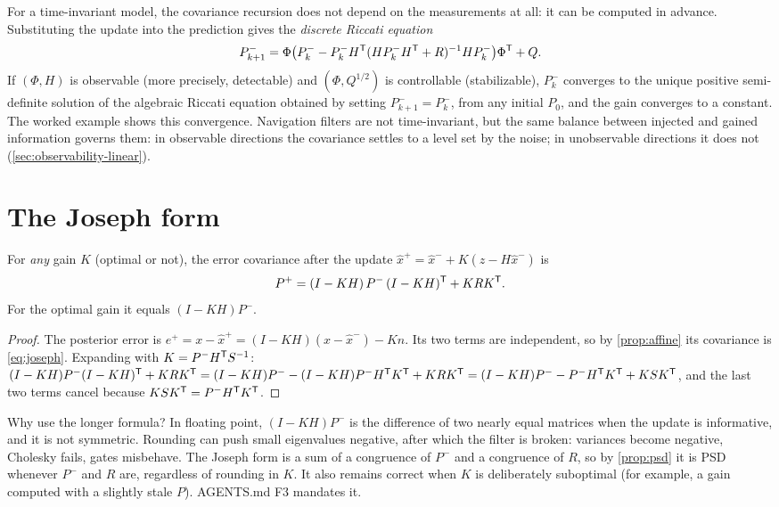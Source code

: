 For a time-invariant model, the covariance recursion does not depend on the measurements at all: it can be computed in advance. Substituting the
update into the prediction gives the \emph{discrete Riccati equation}
\begin{equation}
  P_{k+1}^- = \Phi\big(P_k^- - P_k^-H^{\mathsf{T}}(HP_k^-H^{\mathsf{T}} + R)^{-1} HP_k^-\big)\Phi^{\mathsf{T}} + Q .
\end{equation}
If $(\Phi, H)$ is observable (more precisely, detectable) and $(\Phi, Q^{1/2})$ is controllable (stabilizable), $P_k^-$ converges to the unique positive
semi-definite solution of the algebraic Riccati equation obtained by setting $P_{k+1}^- = P_k^-$, from any initial $P_0$, and the gain converges to a constant.
The worked example shows this convergence. Navigation filters are not time-invariant, but the same balance between injected and gained
information governs them: in observable directions the covariance settles to a level set by the noise; in unobservable directions it does not
(\cref{sec:observability-linear}).

\section{The Joseph form}
\label{sec:joseph}

\begin{proposition}
\label{prop:joseph}
For \emph{any} gain $K$ (optimal or not), the error covariance after the update $\hat x^+ = \hat x^- + K(z - H\hat x^-)$ is
\begin{equation}
  P^+ = (I - KH)\,P^-\,(I - KH)^{\mathsf{T}} + K R K^{\mathsf{T}} .
  \label{eq:joseph}
\end{equation}
For the optimal gain it equals $(I - KH)P^-$.
\end{proposition}
\begin{proof}
The posterior error is $e^+ = x - \hat x^+ = (I - KH)(x - \hat x^-) - Kn$. Its two terms are independent, so by \cref{prop:affine} its covariance is
\eqref{eq:joseph}. Expanding with $K = P^-H^{\mathsf{T}} S^{-1}$:
$(I-KH)P^-(I-KH)^{\mathsf{T}} + KRK^{\mathsf{T}} = (I-KH)P^- - (I-KH)P^-H^{\mathsf{T}} K^{\mathsf{T}} + KRK^{\mathsf{T}} = (I-KH)P^- - P^-H^{\mathsf{T}} K^{\mathsf{T}} + K S K^{\mathsf{T}}$, and the last two terms cancel because
$KSK^{\mathsf{T}} = P^-H^{\mathsf{T}} K^{\mathsf{T}}$.
\end{proof}

Why use the longer formula? In floating point, $(I - KH)P^-$ is the difference of two nearly equal matrices when the update is informative, and it is not
symmetric. Rounding can push small eigenvalues negative, after which the filter is broken: variances become negative, Cholesky fails, gates
misbehave. The Joseph form is a sum of a congruence of $P^-$ and a congruence of $R$, so by \cref{prop:psd} it is PSD whenever $P^-$ and $R$ are,
regardless of rounding in $K$. It also remains correct when $K$ is deliberately suboptimal (for example, a gain computed with a slightly stale $P$).
AGENTS.md F3 mandates it.

